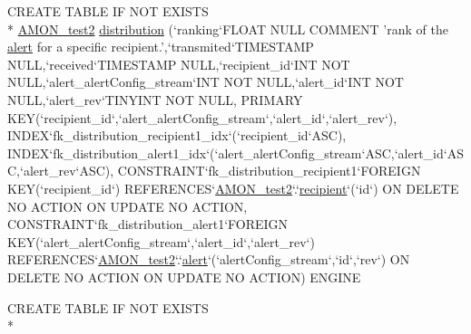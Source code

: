 \begin{DoxyCompactItemize}
\item 
C\-R\-E\-A\-T\-E T\-A\-B\-L\-E I\-F N\-O\-T E\-X\-I\-S\-T\-S \\*
\hyperlink{db__mc__build_8sql_a19c21c59303d8b6591b92240ff7de1d5}{A\-M\-O\-N\-\_\-test2} \hyperlink{db__mc__build_8sql_ab44b8b976cf1914aa2a84f43c304aadf}{distribution} (`ranking`F\-L\-O\-A\-T N\-U\-L\-L C\-O\-M\-M\-E\-N\-T 'rank of the \hyperlink{db__mc__build_8sql_a38a604686c7d372f50752e893e3e1e21}{alert} for a specific recipient.',`transmited`T\-I\-M\-E\-S\-T\-A\-M\-P N\-U\-L\-L,`received`T\-I\-M\-E\-S\-T\-A\-M\-P N\-U\-L\-L,`recipient\-\_\-id`I\-N\-T N\-O\-T N\-U\-L\-L,`alert\-\_\-alert\-Config\-\_\-stream`I\-N\-T N\-O\-T N\-U\-L\-L,`alert\-\_\-id`I\-N\-T N\-O\-T N\-U\-L\-L,`alert\-\_\-rev`T\-I\-N\-Y\-I\-N\-T N\-O\-T N\-U\-L\-L, P\-R\-I\-M\-A\-R\-Y K\-E\-Y(`recipient\-\_\-id`,`alert\-\_\-alert\-Config\-\_\-stream`,`alert\-\_\-id`,`alert\-\_\-rev`), I\-N\-D\-E\-X`fk\-\_\-distribution\-\_\-recipient1\-\_\-idx`(`recipient\-\_\-id`A\-S\-C), I\-N\-D\-E\-X`fk\-\_\-distribution\-\_\-alert1\-\_\-idx`(`alert\-\_\-alert\-Config\-\_\-stream`A\-S\-C,`alert\-\_\-id`A\-S\-C,`alert\-\_\-rev`A\-S\-C), C\-O\-N\-S\-T\-R\-A\-I\-N\-T`fk\-\_\-distribution\-\_\-recipient1`F\-O\-R\-E\-I\-G\-N K\-E\-Y(`recipient\-\_\-id`) R\-E\-F\-E\-R\-E\-N\-C\-E\-S`\hyperlink{db__mc__build_8sql_a19c21c59303d8b6591b92240ff7de1d5}{A\-M\-O\-N\-\_\-test2}`.`\hyperlink{db__mc__build_8sql_a3422288d8b436fcb8603925e692b2aa2}{recipient}`(`id`) O\-N D\-E\-L\-E\-T\-E N\-O A\-C\-T\-I\-O\-N O\-N U\-P\-D\-A\-T\-E N\-O A\-C\-T\-I\-O\-N, C\-O\-N\-S\-T\-R\-A\-I\-N\-T`fk\-\_\-distribution\-\_\-alert1`F\-O\-R\-E\-I\-G\-N K\-E\-Y(`alert\-\_\-alert\-Config\-\_\-stream`,`alert\-\_\-id`,`alert\-\_\-rev`) R\-E\-F\-E\-R\-E\-N\-C\-E\-S`\hyperlink{db__mc__build_8sql_a19c21c59303d8b6591b92240ff7de1d5}{A\-M\-O\-N\-\_\-test2}`.`\hyperlink{db__mc__build_8sql_a38a604686c7d372f50752e893e3e1e21}{alert}`(`alert\-Config\-\_\-stream`,`id`,`rev`) O\-N D\-E\-L\-E\-T\-E N\-O A\-C\-T\-I\-O\-N O\-N U\-P\-D\-A\-T\-E N\-O A\-C\-T\-I\-O\-N) E\-N\-G\-I\-N\-E
\item 
C\-R\-E\-A\-T\-E T\-A\-B\-L\-E I\-F N\-O\-T E\-X\-I\-S\-T\-S \\*

\end{DoxyCompactItemize}
